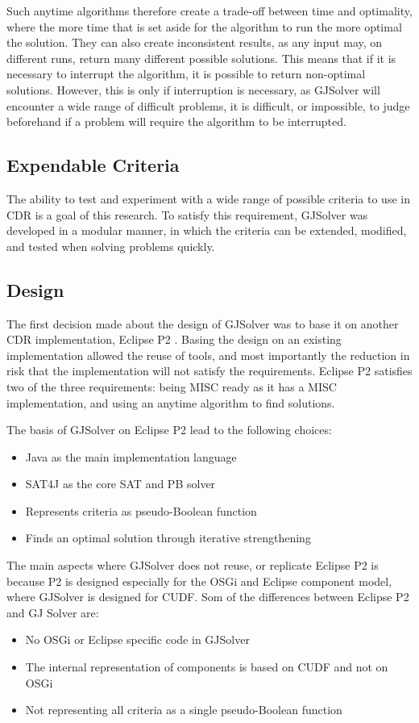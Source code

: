 Such anytime algorithms therefore create a trade-off between time and optimality, where the more time that is set aside for the algorithm to run the more optimal the solution. 
They can also create inconsistent results, as any input may, on different runs, return many different possible solutions.
This means that if it is necessary to interrupt the algorithm, it is possible to return non-optimal solutions.
However, this is only if interruption is necessary, as GJSolver will encounter a wide range of difficult problems, 
it is difficult, or impossible, to judge beforehand if a problem will require the algorithm to be interrupted. 

\subsection{Expendable Criteria}
The ability to test and experiment with a wide range of possible criteria to use in CDR is a goal of this research.
To satisfy this requirement, GJSolver was developed in a modular manner, in which the criteria can be extended, modified, and tested when solving problems quickly.

\subsection{Design}
The first decision made about the design of GJSolver was to base it on another CDR implementation, Eclipse P2 \citep{le_berre_dependency_2009,leBerre2010}.
Basing the design on an existing implementation allowed the reuse of tools, and most importantly the reduction in risk that the implementation will not satisfy the requirements.
Eclipse P2 satisfies two of the three requirements: being MISC ready as it has a MISC implementation, and using an anytime algorithm to find solutions. 

The basis of GJSolver on Eclipse P2 lead to the following choices:
\begin{itemize}
  \item Java as the main implementation language
  \item SAT4J as the core SAT and PB solver
  \item Represents criteria as pseudo-Boolean function
  \item Finds an optimal solution through iterative strengthening
\end{itemize}

The main aspects where GJSolver does not reuse, or replicate Eclipse P2 is because P2 is designed especially for the OSGi and Eclipse component model, where GJSolver is designed for CUDF.
Som of the differences between Eclipse P2 and GJ Solver are:
\begin{itemize}
  \item No OSGi or Eclipse specific code in GJSolver
  \item The internal representation of components is based on CUDF and not on OSGi
  \item Not representing all criteria as a single pseudo-Boolean function
\end{itemize}

